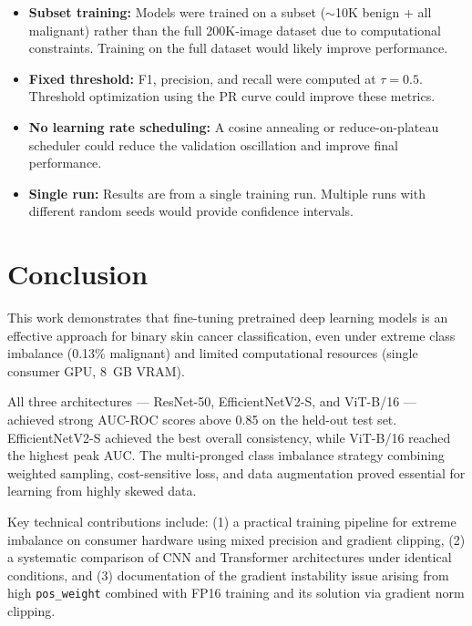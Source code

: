 \documentclass[11pt, a4paper, twocolumn]{article}
\begin{document}
\begin{itemize}[noitemsep]
    \item \textbf{Subset training:} Models were trained on a subset
          ($\sim$10K benign + all malignant) rather than the full
          200K-image dataset due to computational constraints.
          Training on the full dataset would likely improve performance.
    \item \textbf{Fixed threshold:} F1, precision, and recall were
          computed at $\tau = 0.5$. Threshold optimization using the
          PR curve could improve these metrics.
    \item \textbf{No learning rate scheduling:} A cosine annealing or
          reduce-on-plateau scheduler could reduce the validation
          oscillation and improve final performance.
    \item \textbf{Single run:} Results are from a single training run.
          Multiple runs with different random seeds would provide
          confidence intervals.
\end{itemize}

\section{Conclusion}
\label{sec:conclusion}

This work demonstrates that fine-tuning pretrained deep learning models
is an effective approach for binary skin cancer classification, even
under extreme class imbalance (0.13\% malignant) and limited
computational resources (single consumer GPU, 8~GB VRAM).

All three architectures --- ResNet-50, EfficientNetV2-S, and ViT-B/16
--- achieved strong AUC-ROC scores above 0.85 on the held-out test set.
EfficientNetV2-S achieved the best overall consistency, while ViT-B/16
reached the highest peak AUC. The multi-pronged class imbalance
strategy combining weighted sampling, cost-sensitive loss, and data
augmentation proved essential for learning from highly skewed data.

Key technical contributions include: (1) a practical training pipeline
for extreme imbalance on consumer hardware using mixed precision and
gradient clipping, (2) a systematic comparison of CNN and Transformer
architectures under identical conditions, and (3) documentation of
the gradient instability issue arising from high \texttt{pos\_weight}
combined with FP16 training and its solution via gradient norm clipping.
\end{document}
